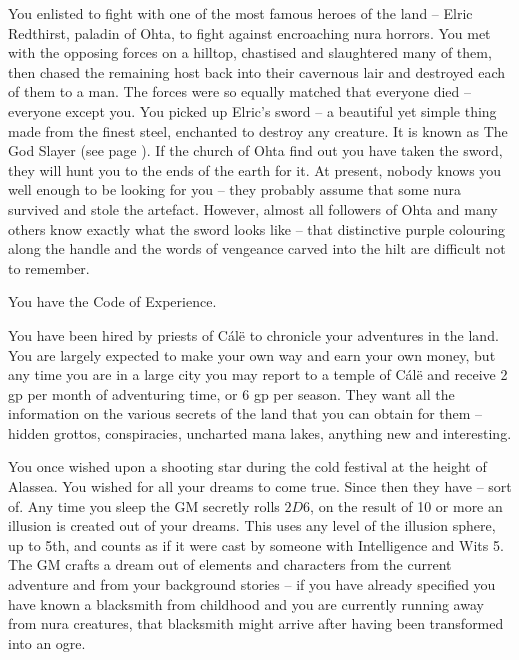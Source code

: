\begin{multicols}{2}
\begin{list}{\addtocounter{list}{1}\textbf{:}}{\raggedleft}
	\item
	You enlisted to fight with one of the most famous heroes of the land -- Elric Redthirst, paladin of Ohta, to fight against encroaching nura horrors.
	You met with the opposing forces on a hilltop, chastised and slaughtered many of them, then chased the remaining host back into their cavernous lair and destroyed each of them to a man.
	The forces were so equally matched that everyone died -- everyone except you.
	You picked up Elric's sword -- a beautiful yet simple thing made from the finest steel, enchanted to destroy any creature.
	It is known as The God Slayer (see page \pageref{godslayer}).
	If the church of Ohta find out you have taken the sword, they will hunt you to the ends of the earth for it.
	At present, nobody knows you well enough to be looking for you -- they probably assume that some nura survived and stole the artefact.
	However, almost all followers of Ohta and many others know exactly what the sword looks like -- that distinctive purple colouring along the handle and the words of vengeance carved into the hilt are difficult not to remember.

	You have the Code of Experience.

	\item
	You have been hired by priests of C\'{a}l\"{e} to chronicle your adventures in the land.
	You are largely expected to make your own way and earn your own money, but any time you are in a large city you may report to a temple of C\'{a}l\"{e} and receive 2 gp per month of adventuring time, or 6 gp per season.
	They want all the information on the various secrets of the land that you can obtain for them -- hidden grottos, conspiracies, uncharted mana lakes, anything new and interesting.

	\item
	You once wished upon a shooting star during the cold festival at the height of Alassea.
	You wished for all your dreams to come true.
	Since then they have -- sort of.
	Any time you sleep the GM secretly rolls $2D6$, on the result of 10 or more an illusion is created out of your dreams.
	This uses any level of the illusion sphere, up to 5th, and counts as if it were cast by someone with Intelligence and Wits 5.
	The GM crafts a dream out of elements and characters from the current adventure and from your background stories -- if you have already specified you have known a blacksmith from childhood and you are currently running away from nura creatures, that blacksmith might arrive after having been transformed into an ogre.


\end{list}
\end{multicols}
